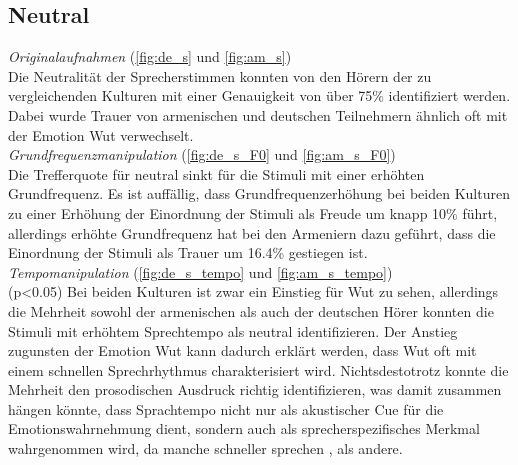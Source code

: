 \documentclass[11pt,a4paper,headsepline,twoside,toc=bibliography]{scrreprt}
\begin{document}
\subsection{Neutral}
\label{sec:neutral}

\emph{Originalaufnahmen} (\autoref{fig:de_s} und \ref{fig:am_s}) \\

Die Neutralität der Sprecherstimmen konnten von den Hörern der zu vergleichenden Kulturen mit einer Genauigkeit von über 75\% identifiziert werden. Dabei wurde Trauer von armenischen und deutschen Teilnehmern ähnlich oft mit der Emotion Wut verwechselt.\\

\noindent
\emph{Grundfrequenzmanipulation} (\autoref{fig:de_s_F0} und \ref{fig:am_s_F0}) \\

Die Trefferquote für neutral sinkt für die Stimuli mit einer erhöhten Grundfrequenz. Es ist auffällig, dass Grundfrequenzerhöhung bei beiden Kulturen zu einer Erhöhung der Einordnung der Stimuli als Freude um knapp 10\% führt, allerdings erhöhte Grundfrequenz hat bei den Armeniern dazu geführt, dass die Einordnung der Stimuli als Trauer um 16.4\% gestiegen ist. \\

\noindent
\emph{Tempomanipulation} (\autoref{fig:de_s_tempo} und \ref{fig:am_s_tempo}) \\
(p<0.05)
Bei beiden Kulturen ist zwar ein Einstieg für Wut zu sehen, allerdings die Mehrheit sowohl der armenischen als auch der deutschen Hörer konnten die Stimuli mit erhöhtem Sprechtempo als neutral identifizieren. Der Anstieg zugunsten der Emotion Wut kann dadurch erklärt werden, dass Wut oft mit einem schnellen Sprechrhythmus charakterisiert wird. Nichtsdestotrotz konnte die Mehrheit den prosodischen Ausdruck richtig identifizieren, was damit zusammen hängen könnte, dass Sprachtempo nicht nur als akustischer Cue für die Emotionswahrnehmung dient, sondern auch als sprecherspezifisches Merkmal wahrgenommen wird, da manche schneller sprechen , als andere. 
\end{document}
